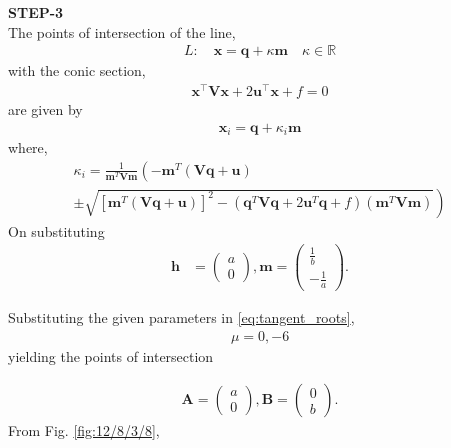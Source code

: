 \documentclass[10pt,a4paper]{report}
\newcommand{\myvec}[1]{\ensuremath{\begin{pmatrix}#1\end{pmatrix}}}
\let\vec\mathbf
\let\vec\mathbf
\providecommand{\brak}[1]{\ensuremath{\left(#1\right)}}
\providecommand{\lbrak}[1]{\ensuremath{\left(#1\right.}}
\providecommand{\rbrak}[1]{\ensuremath{\left.#1\right)}}
\providecommand{\sbrak}[1]{\ensuremath{{}\left[#1\right]}}
\begin{document}
\begin{multicols}{2}
\textbf{STEP-3}\vspace{2mm}\\
The points of intersection of the line, \\ 
\begin{align}
L: \quad \vec{x} = \vec{q} + \kappa \vec{m} \quad \kappa \in \mathbb{R}
\end{align}
with the conic section, \\ 
\begin{align}
	\vec{x}^{\top}\vec{V}\vec{x} + 2\vec{u}^{\top} \vec{x} + f = 0
\end{align}
are given by \\
\begin{align}
\vec{x}_i = \vec{q} + \kappa_i \vec{m}
\end{align}
where, \\
{\tiny
\begin{multline}
\kappa_i = \frac{1}
{
\vec{m}^T\vec{V}\vec{m}
}
\lbrak{-\vec{m}^T\brak{\vec{V}\vec{q}+\vec{u}}}
\\
\pm
\rbrak{\sqrt{
\sbrak{
\vec{m}^T\brak{\vec{V}\vec{q}+\vec{u}}
}^2
-
\brak
{
\vec{q}^T\vec{V}\vec{q} + 2\vec{u}^T\vec{q} +f
}
\brak{\vec{m}^T\vec{V}\vec{m}}
}
}
\end{multline}
}
On substituting\\
\fi
\begin{align}
\vec{h} &= \myvec{
a\\
0
},
\vec{m} = \myvec{\frac{1}{b} \\ -\frac{1}{a}}.
\end{align}

Substituting the given parameters in \eqref{eq:tangent_roots},
\begin{align}
    \mu=0,-6
\end{align}
yielding the points of intersection

\begin{align}
    \vec{A}=\myvec{
a\\
0
    },
    \vec{B}=\myvec{
0\\
b
    }.
\end{align}
From Fig. 
		\ref{fig:12/8/3/8},
		\iffalse

\end{multicols}
\end{document}
